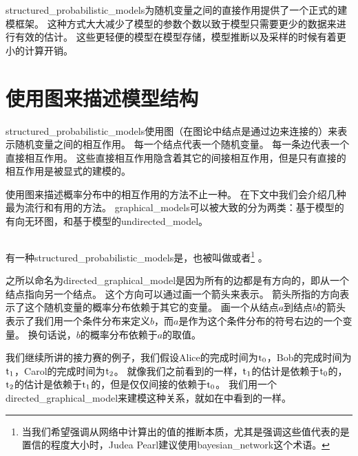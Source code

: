 \gls{structured_probabilistic_models}为随机变量之间的直接作用提供了一个正式的建模框架。
这种方式大大减少了模型的参数个数以致于模型只需要更少的数据来进行有效的估计。
这些更轻便的模型在模型存储，模型推断以及采样的时候有着更小的计算开销。











\section{使用图来描述模型结构}
\label{sec:using_graphs_to_describe_model_structure}


\gls{structured_probabilistic_models}使用图（在图论中结点是通过边来连接的）来表示随机变量之间的相互作用。
每一个结点代表一个随机变量。
每一条边代表一个直接相互作用。
这些直接相互作用隐含着其它的间接相互作用，但是只有直接的相互作用是被显式的建模的。


使用图来描述概率分布中的相互作用的方法不止一种。
在下文中我们会介绍几种最为流行和有用的方法。
\gls{graphical_models}可以被大致的分为两类：基于模型的有向无环图，和基于模型的\gls{undirected_model}。


\subsection{}
\label{sec:directed_models}


有一种\gls{structured_probabilistic_models}是，也被叫做或者\footnote{当我们希望强调从网络中计算出的值的推断本质，尤其是强调这些值代表的是置信的程度大小时，Judea Pearl建议使用\gls{bayesian_network}这个术语。} \citep{pearl85bayesian}。


之所以命名为\gls{directed_graphical_model}是因为所有的边都是有方向的，即从一个结点指向另一个结点。
这个方向可以通过画一个箭头来表示。
箭头所指的方向表示了这个随机变量的概率分布依赖于其它的变量。
画一个从结点$a$到结点$b$的箭头表示了我们用一个条件分布来定义$b$，而$a$是作为这个条件分布的符号右边的一个变量。
换句话说，$b$的概率分布依赖于$a$的取值。


我们继续所讲的接力赛的例子，我们假设Alice的完成时间为$\mathrm{t}_0$，Bob的完成时间为$\mathrm{t}_1$，Carol的完成时间为$\mathrm{t}_2$。
就像我们之前看到的一样，$\mathrm{t}_1$的估计是依赖于$\mathrm{t}_0$的，$\mathrm{t}_2$的估计是依赖于$\mathrm{t}_1$的，但是仅仅间接的依赖于$\mathrm{t}_0$。
我们用一个\gls{directed_graphical_model}来建模这种关系，就如在中看到的一样。

